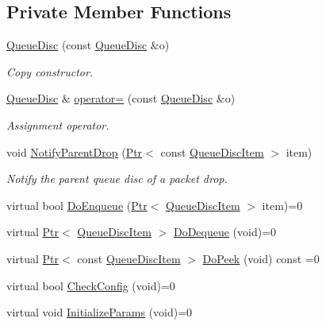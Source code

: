 \subsection*{Private Member Functions}
\begin{DoxyCompactItemize}
\item 
\hyperlink{classns3_1_1QueueDisc_abec93e451217e4b2660c71abebdd08fd}{Queue\+Disc} (const \hyperlink{classns3_1_1QueueDisc}{Queue\+Disc} \&o)
\begin{DoxyCompactList}\small\item\em Copy constructor. \end{DoxyCompactList}\item 
\hyperlink{classns3_1_1QueueDisc}{Queue\+Disc} \& \hyperlink{classns3_1_1QueueDisc_a9a2023229369d282aa4714124cf772f2}{operator=} (const \hyperlink{classns3_1_1QueueDisc}{Queue\+Disc} \&o)
\begin{DoxyCompactList}\small\item\em Assignment operator. \end{DoxyCompactList}\item 
void \hyperlink{classns3_1_1QueueDisc_aee0b845da519a8121dbe5a397ed63b54}{Notify\+Parent\+Drop} (\hyperlink{classns3_1_1Ptr}{Ptr}$<$ const \hyperlink{classns3_1_1QueueDiscItem}{Queue\+Disc\+Item} $>$ item)
\begin{DoxyCompactList}\small\item\em Notify the parent queue disc of a packet drop. \end{DoxyCompactList}\item 
virtual bool \hyperlink{classns3_1_1QueueDisc_a22d77d2ec26e6fe5476d976d9d5e3a66}{Do\+Enqueue} (\hyperlink{classns3_1_1Ptr}{Ptr}$<$ \hyperlink{classns3_1_1QueueDiscItem}{Queue\+Disc\+Item} $>$ item)=0
\item 
virtual \hyperlink{classns3_1_1Ptr}{Ptr}$<$ \hyperlink{classns3_1_1QueueDiscItem}{Queue\+Disc\+Item} $>$ \hyperlink{classns3_1_1QueueDisc_afefae1a05f45db101c2c75d67a440c63}{Do\+Dequeue} (void)=0
\item 
virtual \hyperlink{classns3_1_1Ptr}{Ptr}$<$ const \hyperlink{classns3_1_1QueueDiscItem}{Queue\+Disc\+Item} $>$ \hyperlink{classns3_1_1QueueDisc_aff6a0523b7132a4df6cf202ab49bd788}{Do\+Peek} (void) const =0
\item 
virtual bool \hyperlink{classns3_1_1QueueDisc_ace6ef0c9afd0954c4629ad454bf975f5}{Check\+Config} (void)=0
\item 
virtual void \hyperlink{classns3_1_1QueueDisc_a600ed3e7110b9d506b28ad62beb84592}{Initialize\+Params} (void)=0

\end{DoxyCompactItemize}
